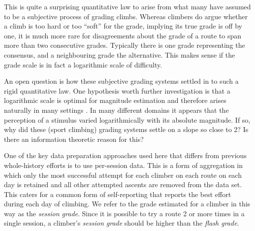 \documentclass{article}
\begin{document}
This is quite a surprising quantitative law to arise from what many have assumed to be a subjective process of grading climbs. Whereas climbers do argue whether a climb is too hard or too ``soft'' for the grade, implying its true grade is off by one, it is much more rare for disagreements about the grade of a route to span more than two consecutive grades. Typically there is one grade representing the consensus, and a neighbouring grade the alternative. This makes sense if the grade scale is in fact a logarithmic scale of difficulty.  

An open question is how these subjective grading systems settled in to such a rigid quantitative law. One hypothesis worth further investigation is that a logarithmic scale is optimal for magnitude estimation and therefore arises naturally in many settings \cite{portugal2011weber}. In many different domains it appears that the perception of a stimulus varied logarithmically with its absolute magnitude. If so, why did these (sport climbing) grading systems settle on a slope so close to 2? Is there an information theoretic reason for this?

One of the key data preparation approaches used here that differs from previous whole-history efforts is to use per-session data. This is a form of aggregation in which only the most successful attempt for each climber on each route on each day is retained and all other attempted ascents are removed from the data set. This caters for a common form of self-reporting that reports the best effort during each day of climbing. We refer to the grade estimated for a climber in this way as the {\it session grade}. Since it is possible to try a route 2 or more times in a single session, a climber's {\it session grade} should be higher than the {\it flash grade}. 
\end{document}
